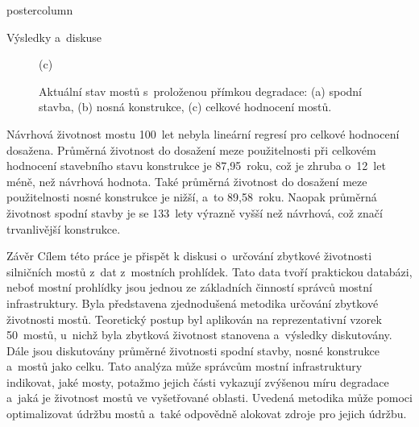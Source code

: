 \documentclass{beamer}
\begin{document}
\begin{frame}
\begin{columns}
\begin{column}{.60\textwidth}
\begin{beamercolorbox}[center]{postercolumn}
\begin{minipage}{.98\textwidth}
{\begin{myblock}{Výsledky a~diskuse}
\begin{figure}
\begin{minipage}{0.30\textwidth}
								\caption*{(c)}
							\end{minipage}
							\caption{Aktuální stav mostů s~proloženou přímkou degradace: (a) spodní stavba, (b) nosná konstrukce, (c) celkové hodnocení mostů.}
						\end{figure}
						Návrhová životnost mostu 100~let nebyla lineární regresí pro celkové hodnocení dosažena. Průměrná životnost do dosažení meze použitelnosti při celkovém hodnocení stavebního stavu konstrukce je 87,95~roku, což je zhruba o~12~let méně, než návrhová hodnota. Také průměrná životnost do dosažení meze použitelnosti nosné konstrukce je nižší, a~to 89,58~roku. Naopak průměrná životnost spodní stavby je se 133~lety výrazně vyšší než návrhová, což značí trvanlivější konstrukce.
					\end{myblock}\vfill
					\begin{myblock}{Závěr}
						Cílem této práce je přispět k diskusi o~určování zbytkové životnosti silničních mostů z~dat z~mostních prohlídek. Tato data tvoří praktickou databázi, neboť mostní prohlídky jsou jednou ze základních činností správců mostní infrastruktury. Byla představena zjednodušená metodika určování zbytkové životnosti mostů. Teoretický postup byl aplikován na reprezentativní vzorek 50~mostů, u~nichž byla zbytková životnost stanovena a~výsledky diskutovány. Dále jsou diskutovány průměrné životnosti spodní stavby, nosné konstrukce a~mostů jako celku. Tato analýza může správcům mostní infrastruktury indikovat, jaké mosty, potažmo jejich části vykazují zvýšenou míru degradace a~jaká je životnost mostů ve vyšetřované oblasti. Uvedená metodika může pomoci optimalizovat údržbu mostů a~také odpovědně alokovat zdroje pro jejich údržbu.
					\end{myblock}\vfill
		}\end{minipage}\end{beamercolorbox}
	\end{column}
\end{columns}
\end{frame}
\end{document}
